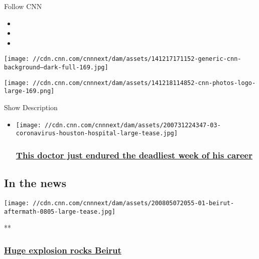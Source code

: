 Follow CNN

\begin{itemize}
\item
\item
\item
\end{itemize}

\texttt{[image: //cdn.cnn.com/cnnnext/dam/assets/141217171152-generic-cnn-background---dark-full-169.jpg]}

\texttt{[image: //cdn.cnn.com/cnnnext/dam/assets/141218114852-cnn-photos-logo-large-169.png]}

Show Description

\begin{itemize}
\item
  \href{https://www.cnn.com/interactive/2020/07/health/coronavirus-houston-hospital/index.html}{}

  \texttt{[image: //cdn.cnn.com/cnnnext/dam/assets/200731224347-03-coronavirus-houston-hospital-large-tease.jpg]}

  \hypertarget{this-doctor-just-endured-the-deadliest-week-of-his-career}{%
  \subsubsection{\texorpdfstring{\href{https://www.cnn.com/interactive/2020/07/health/coronavirus-houston-hospital/index.html}{This
  doctor just endured the deadliest week of his
  career}}{This doctor just endured the deadliest week of his career}}\label{this-doctor-just-endured-the-deadliest-week-of-his-career}}
\end{itemize}

\hypertarget{in-the-news-}{%
\subsection{In the news~}\label{in-the-news-}}

\href{/2020/08/04/middleeast/gallery/beirut-explosion/index.html}{}

\texttt{[image: //cdn.cnn.com/cnnnext/dam/assets/200805072055-01-beirut-aftermath-0805-large-tease.jpg]}

**

\hypertarget{huge-explosion-rocks-beirut}{%
\subsubsection{\texorpdfstring{\href{/2020/08/04/middleeast/gallery/beirut-explosion/index.html}{Huge
explosion rocks
Beirut}}{Huge explosion rocks Beirut}}\label{huge-explosion-rocks-beirut}}

